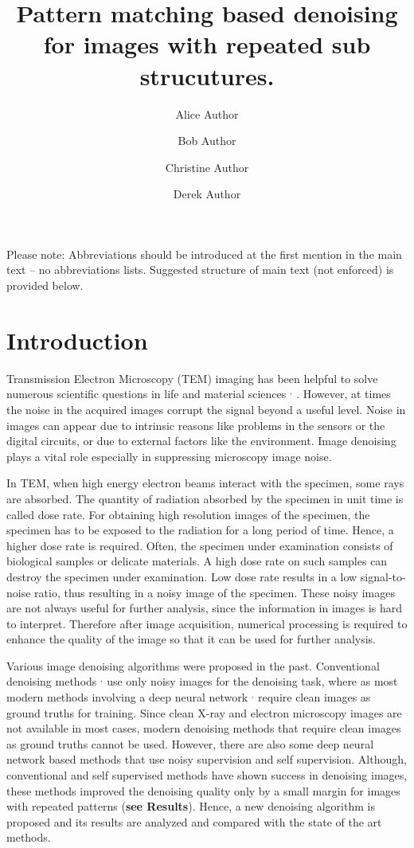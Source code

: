 \documentclass[fleqn,10pt]{wlscirep}
\title{Pattern matching based denoising for images with repeated sub strucutures.}
\author[1,*]{Alice Author}
\author[2]{Bob Author}
\author[1,2,+]{Christine Author}
\author[2,+]{Derek Author}
\affil[1]{Affiliation, department, city, postcode, country}
\affil[2]{Affiliation, department, city, postcode, country}
\affil[*]{corresponding.author@email.example}
\affil[+]{these authors contributed equally to this work}
\begin{document}
\flushbottom
\maketitle
%
%
\thispagestyle{empty}

\noindent Please note: Abbreviations should be introduced at the first mention in the main text – no abbreviations lists. Suggested structure of main text (not enforced) is provided below.

\section*{Introduction}

Transmission Electron Microscopy (TEM) imaging has been helpful to solve numerous scientific questions in life and material sciences \cite{CURRY200691}$^{,}$\cite{WANG2008395} . However, at times the noise in the acquired images corrupt the signal beyond a useful level. Noise in images can appear due to intrinsic reasons like problems in the sensors or the digital circuits, or due to external factors like the environment. Image denoising plays a vital role especially in suppressing microscopy image noise.

In TEM, when high energy electron beams interact with the specimen, some rays are absorbed. The quantity of radiation absorbed by the specimen in unit time is called dose rate. For obtaining high resolution images of the specimen, the specimen has to be exposed to the radiation for a long period of time. Hence, a higher dose rate is required. Often, the specimen under examination consists of biological samples or delicate materials. A high dose rate on such samples can destroy the specimen under examination. Low dose rate results in a low signal-to-noise ratio, thus resulting in a noisy image of the specimen. These noisy images are not always useful for further analysis, since the information in images is hard to interpret. Therefore after image acquisition, numerical processing is required to enhance the quality of the image so that it can be used for further analysis. 

Various image denoising algorithms were proposed in the past. Conventional denoising methods  \cite{bcm_nlm}$^{,}$ \cite{DBLP:journals/tip/BM3D} use only noisy images for the denoising task, where as most modern methods involving a deep neural network \cite{zhang2018ffdnet}$^{,}$ \cite{zhang2017beyond} require clean images as ground truths for training. Since clean X-ray and electron microscopy images are not available in most cases, modern denoising methods that require clean images as ground truths cannot be used. However, there are also some deep neural network based methods that use noisy supervision \cite{DBLP:journals/corr/abs-1803-04189} and self supervision\cite{krull2019noise2void}. Although, conventional and self supervised methods have shown success in denoising images, these methods improved the denoising quality only by a small margin for images with repeated patterns (\textbf{see Results}). Hence, a new denoising algorithm is proposed and its results are analyzed and compared with the state of the art methods. 
\end{document}
